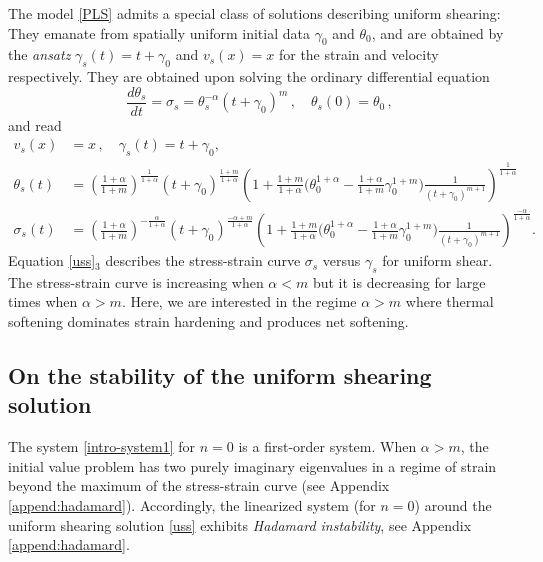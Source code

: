 \documentclass[11pt]{article}
\theoremstyle{remark}
\begin{document}
The model \eqref{PLS} admits  a special class of solutions describing uniform shearing: They emanate
from spatially uniform initial data $\gamma_0$ and $\theta_0$, and are obtained by the {\it ansatz} $\gamma_s (t) = t + \gamma_0 $ and $v_s (x) = x$
for the strain and velocity respectively. They are obtained
upon solving the ordinary differential equation
\begin{equation}
\label{uss2}
\frac{d \theta_s }{dt} = \sigma_s = \theta_s^{-\alpha} (t + \gamma_0)^m \, , \quad \theta_s(0) = \theta_0 \, ,
\end{equation}
and read
\begin{equation} \label{uss}
\begin{aligned}
v_s (x)  &=x \, ,   \quad  \gamma_s(t) = t+\gamma_0,  \quad
\\
\theta_s(t) &=  \left( \tfrac{1+\alpha}{1+m }\right )^{\frac{1}{1+\alpha}}  (t+\gamma_0)^{\frac{1 + m}{1+\alpha}}
 \left( 1 +  \tfrac{1+m}{1+\alpha} \big (  \theta_0^{1+\alpha}  - \tfrac{1+\alpha}{1+m} \gamma_0^{1+m} \big ) \tfrac{1}{(t+\gamma_0)^{m+1}}  \right)^{\frac{1}{1+\alpha}}
 \\
  \sigma_s(t)&=
   \left( \tfrac{1+\alpha}{1+m}\right )^{-\frac{\alpha}{1+\alpha}}  (t+\gamma_0)^{\frac{-\alpha + m}{1+\alpha}}
   \left( 1 +  \tfrac{1+m}{1+\alpha} \big (  \theta_0^{1+\alpha}  - \tfrac{1+\alpha}{1+m} \gamma_0^{1+m} \big ) \tfrac{1}{(t+\gamma_0)^{m+1}}  \right)^{\frac{-\alpha}{1+\alpha}} .
\end{aligned}
\end{equation}
Equation \eqref{uss}$_3$ describes the stress-strain curve $\sigma_s$ versus $\gamma_s$ for uniform shear.
The stress-strain curve is increasing when $\alpha < m$ but it is decreasing for large times when $\alpha > m$.
Here, we are interested in the regime $\alpha > m$ where thermal softening dominates strain hardening and produces net softening.



\subsection{On the stability of the uniform shearing solution}

The system \eqref{intro-system1} for $n=0$ is a first-order system. When $\alpha > m$, the initial value problem  has two purely imaginary eigenvalues in a regime
of strain beyond the maximum of the stress-strain curve (see Appendix \ref{append:hadamard}).
Accordingly, the linearized system (for $n=0$) around the uniform shearing solution \eqref{uss} exhibits {\it Hadamard instability}, see Appendix \ref{append:hadamard}.
\end{document}

